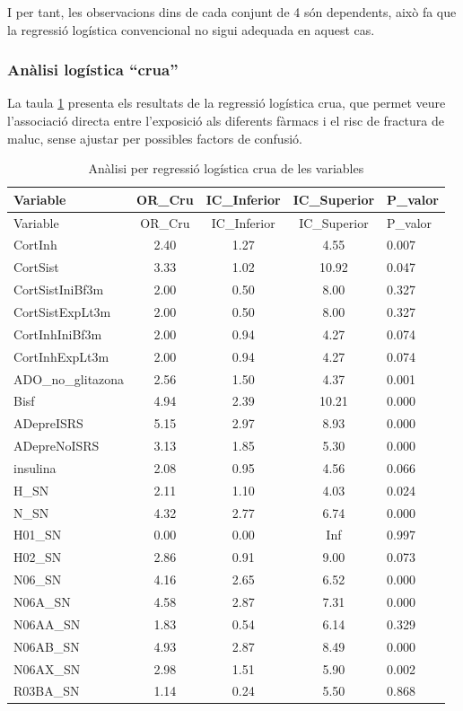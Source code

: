 \documentclass[
]{article}
\begin{document}
I per tant, les observacions dins de cada conjunt de 4 són dependents,
això fa que la regressió logística convencional no sigui adequada en
aquest cas.

\subsubsection{Anàlisi logística
``crua''}\label{anuxe0lisi-loguxedstica-crua}

La taula \ref{tab:logcru} presenta els resultats de la regressió
logística crua, que permet veure l'associació directa entre l'exposició
als diferents fàrmacs i el risc de fractura de maluc, sense ajustar per
possibles factors de confusió.

\begin{longtable}[]{@{}lcccl@{}}
\caption{\label{tab:logcru}Anàlisi per regressió logística crua de les
variables}\tabularnewline
\toprule\noalign{}
Variable & OR\_Cru & IC\_Inferior & IC\_Superior & P\_valor \\
\midrule\noalign{}
\endfirsthead
\toprule\noalign{}
Variable & OR\_Cru & IC\_Inferior & IC\_Superior & P\_valor \\
\midrule\noalign{}
\endhead
\bottomrule\noalign{}
\endlastfoot
CortInh & 2.40 & 1.27 & 4.55 & 0.007 \\
CortSist & 3.33 & 1.02 & 10.92 & 0.047 \\
CortSistIniBf3m & 2.00 & 0.50 & 8.00 & 0.327 \\
CortSistExpLt3m & 2.00 & 0.50 & 8.00 & 0.327 \\
CortInhIniBf3m & 2.00 & 0.94 & 4.27 & 0.074 \\
CortInhExpLt3m & 2.00 & 0.94 & 4.27 & 0.074 \\
ADO\_no\_glitazona & 2.56 & 1.50 & 4.37 & 0.001 \\
Bisf & 4.94 & 2.39 & 10.21 & 0.000 \\
ADepreISRS & 5.15 & 2.97 & 8.93 & 0.000 \\
ADepreNoISRS & 3.13 & 1.85 & 5.30 & 0.000 \\
insulina & 2.08 & 0.95 & 4.56 & 0.066 \\
H\_SN & 2.11 & 1.10 & 4.03 & 0.024 \\
N\_SN & 4.32 & 2.77 & 6.74 & 0.000 \\
H01\_SN & 0.00 & 0.00 & Inf & 0.997 \\
H02\_SN & 2.86 & 0.91 & 9.00 & 0.073 \\
N06\_SN & 4.16 & 2.65 & 6.52 & 0.000 \\
N06A\_SN & 4.58 & 2.87 & 7.31 & 0.000 \\
N06AA\_SN & 1.83 & 0.54 & 6.14 & 0.329 \\
N06AB\_SN & 4.93 & 2.87 & 8.49 & 0.000 \\
N06AX\_SN & 2.98 & 1.51 & 5.90 & 0.002 \\
R03BA\_SN & 1.14 & 0.24 & 5.50 & 0.868 \\
\end{longtable}
\end{document}
